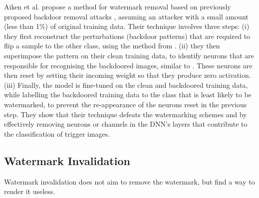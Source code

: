 Aiken et al. \cite{aiken_neural_2020} propose a method for watermark removal based on previously proposed backdoor removal attacks \cite{wang_neural_2019, liu_fine-pruning_2018}, assuming an attacker with a small amount (less than 1\%) of original training data.
Their technique involves three steps: (i) they first reconstruct the perturbations (backdoor patterns) that are required to flip a sample to the other class, using the method from \cite{wang_neural_2019}. 
(ii) they then superimpose the pattern on their clean training data, to identify neurons that are responsible for recognising the backdoored images, similar to \cite{liu_fine-pruning_2018}. These neurons are then reset by setting their incoming weight so that they produce zero activation. (iii) Finally, the model is fine-tuned on the clean and backdoored training data, while labelling the backdoored training data to the class that is least likely to be watermarked, to prevent the re-appearance of the neurons reset in the previous step.
They show that their technique defeats the watermarking schemes \cite{zhang_protecting_2018} and \cite{adi_turning_2018} by effectively removing neurons or channels in the DNN's layers that contribute to the classification of trigger images. %

\subsection{Watermark Invalidation}
Watermark invalidation does not aim to remove the watermark, but find a way to render it useless.

